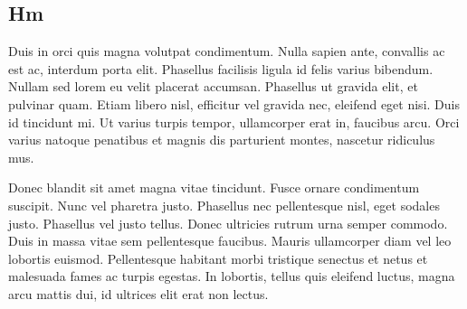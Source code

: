\documentclass{article}
\begin{document}
\subsection{Hm}
Duis in orci quis magna volutpat condimentum. Nulla sapien ante, convallis ac est ac, interdum porta elit. Phasellus facilisis ligula id felis varius bibendum. Nullam sed lorem eu velit placerat accumsan. Phasellus ut gravida elit, et pulvinar quam. Etiam libero nisl, efficitur vel gravida nec, eleifend eget nisi. Duis id tincidunt mi. Ut varius turpis tempor, ullamcorper erat in, faucibus arcu. Orci varius natoque penatibus et magnis dis parturient montes, nascetur ridiculus mus.

Donec blandit sit amet magna vitae tincidunt. Fusce ornare condimentum suscipit. Nunc vel pharetra justo. Phasellus nec pellentesque nisl, eget sodales justo. Phasellus vel justo tellus. Donec ultricies rutrum urna semper commodo. Duis in massa vitae sem pellentesque faucibus. Mauris ullamcorper diam vel leo lobortis euismod. Pellentesque habitant morbi tristique senectus et netus et malesuada fames ac turpis egestas. In lobortis, tellus quis eleifend luctus, magna arcu mattis dui, id ultrices elit erat non lectus. 
\end{document}
